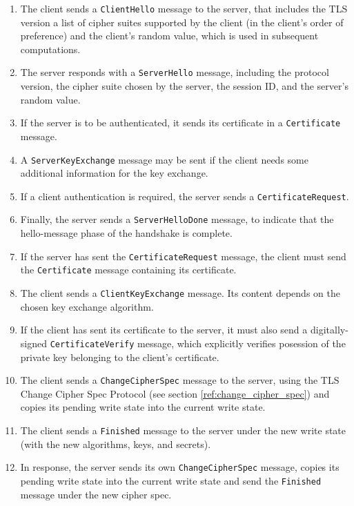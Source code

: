     \begin{enumerate}
        \item The client sends a \texttt{ClientHello} message to the server, that
              includes the TLS version a list of cipher suites supported by the
              client (in the client's order of preference) and the client's
              random value, which is used in subsequent computations.
        \item The server responds with a \texttt{ServerHello} message, including
              the protocol version, the cipher suite chosen by the server, the session ID,
              and the server's random value.
        \item If the server is to be authenticated, it sends its certificate in
              a \texttt{Certificate} message.
        \item A \texttt{ServerKeyExchange} message may be sent if the client
              needs some additional information for the key exchange.
        \item If a client authentication is required, the server sends a
              \texttt{CertificateRequest}.
        \item Finally, the server sends a \texttt{ServerHelloDone} message, to
              indicate that the hello-message phase of the handshake is complete.
        \item If the server has sent the \texttt{CertificateRequest} message, the
              client must send the \texttt{Certificate} message containing its
              certificate.
        \item The client sends a \texttt{ClientKeyExchange} message. Its content
              depends on the chosen key exchange algorithm.
        \item If the client has sent its certificate to the server, it must also
              send a digitally-signed \texttt{CertificateVerify} message, which
              explicitly verifies posession of the private key belonging to the
              client's certificate.
        \item The client sends a \texttt{ChangeCipherSpec} message to the server,
              using the TLS Change Cipher Spec Protocol (see
              section \ref{ref:change_cipher_spec}) and copies its pending write state
              into the current write state.
        \item The client sends a \texttt{Finished} message to the server under
              the new write state (with the new algorithms, keys, and secrets).
        \item In response, the server sends its own \texttt{ChangeCipherSpec}
              message, copies its pending write state into the current write
              state and send the \texttt{Finished} message under the new cipher
              spec.
    \end{enumerate}

